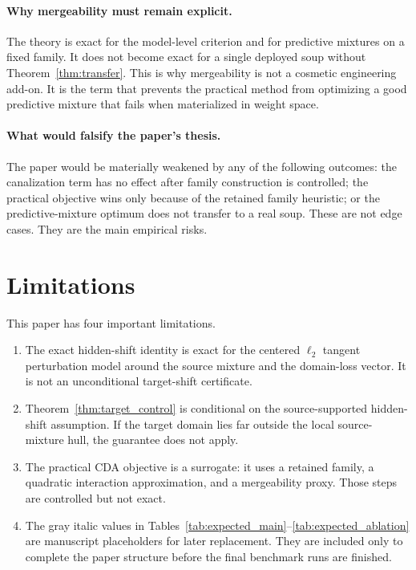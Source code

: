 \documentclass{article}
\theoremstyle{definition}
\newcommand{\cda}{\textup{\textsc{CDA}}}
\begin{document}
\paragraph{Why mergeability must remain explicit.}
The theory is exact for the model-level criterion and for predictive mixtures on a fixed family. It does not become exact for a single deployed soup without Theorem~\ref{thm:transfer}. This is why mergeability is not a cosmetic engineering add-on. It is the term that prevents the practical method from optimizing a good predictive mixture that fails when materialized in weight space.

\paragraph{What would falsify the paper's thesis.}
The paper would be materially weakened by any of the following outcomes: the canalization term has no effect after family construction is controlled; the practical objective wins only because of the retained family heuristic; or the predictive-mixture optimum does not transfer to a real soup. These are not edge cases. They are the main empirical risks.

\section{Limitations}

This paper has four important limitations.
\begin{enumerate}[leftmargin=1.3em]
    \item The exact hidden-shift identity is exact for the centered \(\ell_2\) tangent perturbation model around the source mixture and the domain-loss vector. It is not an unconditional target-shift certificate.
    \item Theorem~\ref{thm:target_control} is conditional on the source-supported hidden-shift assumption. If the target domain lies far outside the local source-mixture hull, the guarantee does not apply.
    \item The practical \cda{} objective is a surrogate: it uses a retained family, a quadratic interaction approximation, and a mergeability proxy. Those steps are controlled but not exact.
    \item The gray italic values in Tables~\ref{tab:expected_main}--\ref{tab:expected_ablation} are manuscript placeholders for later replacement. They are included only to complete the paper structure before the final benchmark runs are finished.
\end{enumerate}
\end{document}
